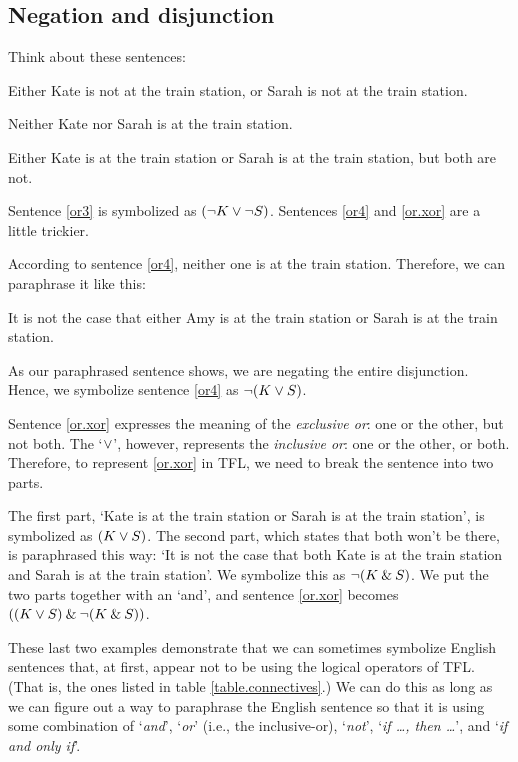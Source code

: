 \subsection{Negation and disjunction}

Think about these sentences:
	\begin{earg}
		\item[\ex{or3}] Either Kate is not at the train station, or Sarah is not at the train station.
		\item[\ex{or4}] Neither Kate nor Sarah is at the train station.
		\item[\ex{or.xor}] Either Kate is at the train station or Sarah is at the train station, but both are not.
	\end{earg}
Sentence \ref{or3} is symbolized as $({\neg} K \vee {\neg} S)$. Sentences \ref{or4} and \ref{or.xor} are a little trickier. 

According to sentence \ref{or4}, neither one is at the train station. Therefore, we can paraphrase it like this:
\begin{ebullet}
	\item[] It is not the case that either Amy is at the train station or Sarah is at the train station. 
\end{ebullet}
As our paraphrased sentence shows, we are negating the entire disjunction. Hence, we symbolize sentence \ref{or4} as ${\neg} (K \vee S)$. 

Sentence \ref{or.xor} expresses the meaning of the \textit{exclusive or}: one or the other, but not both. The `$\vee$', however, represents the \textit{inclusive or}: one or the other, or both. Therefore, to represent \ref{or.xor} in TFL, we need to break the sentence into two parts. 

The first part, `Kate is at the train station or Sarah is at the train station', is symbolized as $(K \vee S)$. The second part, which states that both won't be there, is paraphrased this way: `It is not the case that both Kate is at the train station and Sarah is at the train station'. We symbolize this as ${\neg}(K \mathbin{\&} S)$. We put the two parts together with an `and', and sentence \ref{or.xor} becomes $((K \vee S) \mathbin{\&}  {\neg}(K \mathbin{\&} S))$.

These last two examples demonstrate that we can sometimes symbolize English sentences that, at first, appear not to be using the logical operators of TFL. (That is, the ones listed in table \ref{table.connectives}.) We can do this as long as we can figure out a way to paraphrase the English sentence so that it is using some combination of `\textit{and}', `\textit{or}' (i.e., the inclusive-or), `\textit{not}', `\textit{if \ldots, then \ldots}', and `\textit{if and only if}'. 


